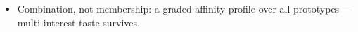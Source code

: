 \begin{itemize}
    \item Combination, not membership: a graded affinity profile over all prototypes — multi-interest taste survives. 

\end{itemize}
